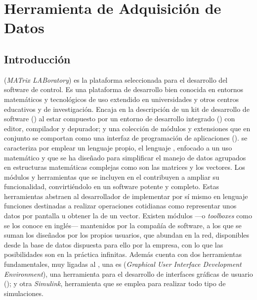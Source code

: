 \section{Herramienta de Adquisición de Datos}


\subsection{Introducción}

 (\emph{MATrix LABoratory}) es la plataforma seleccionada para
el desarrollo del software de control. Es una plataforma de desarrollo bien
conocida en entornos matemáticos y tecnológicos de uso extendido en
universidades y otros centros educativos y de investigación. Encaja en la
descripción de un kit de desarrollo de software () al estar
compuesto por un entorno de desarrollo integrado () con editor,
compilador y depurador; y una colección de módulos y extensiones que en
conjunto se comportan como una interfaz de programación de aplicaciones
().  \matlab{} se caracteriza por emplear un lenguaje propio, el
lenguaje , enfocado a un uso matemático y que se ha diseñado para
simplificar el manejo de datos agrupados en estructuras matemáticas
complejas como son las matrices y los vectores. Los módulos y herramientas
que se incluyen en el  contribuyen a ampliar su funcionalidad,
convirtiéndolo en un software potente y completo. Estas herramientas
abstraen al desarrollador de implementar por sí mismo en lenguaje 
funciones destinadas a realizar operaciones cotidianas como representar
unos datos por pantalla u obtener la  de un vector. Existen
módulos ---o \emph{toolboxes} como se los conoce en inglés--- mantenidos
por la compañía de software, a los que se suman los diseñados por los
propios usuarios, que abundan en la red, disponibles desde la base de datos
dispuesta para ello por la empresa, con lo que las posibilidades son en la
práctica infinitas.  Además \matlab{} cuenta con dos herramientas
fundamentales, muy ligadas al , una es 
(\emph{Graphical User Interface Development Environment}), una herramienta
para el desarrollo de interfaces gráficas de usuario (); y otra
\emph{Simulink}, herramienta que se emplea para realizar todo tipo de
simulaciones.

